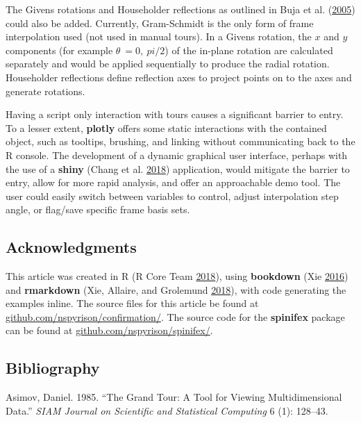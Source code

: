 The Givens rotations and Householder reflections as outlined in Buja et
al. (\protect\hyperlink{ref-buja_computational_2005}{2005}) could also
be added. Currently, Gram-Schmidt is the only form of frame
interpolation used (not used in manual tours). In a Givens rotation, the
\(x\) and \(y\) components (for example \(\theta~= 0,~pi/2\)) of the
in-plane rotation are calculated separately and would be applied
sequentially to produce the radial rotation. Householder reflections
define reflection axes to project points on to the axes and generate
rotations.

Having a script only interaction with tours causes a significant barrier
to entry. To a lesser extent, \textbf{plotly} offers some static
interactions with the contained object, such as tooltips, brushing, and
linking without communicating back to the R console. The development of
a dynamic graphical user interface, perhaps with the use of a
\textbf{shiny} (Chang et al.
\protect\hyperlink{ref-chang_shiny:_2018}{2018}) application, would
mitigate the barrier to entry, allow for more rapid analysis, and offer
an approachable demo tool. The user could easily switch between
variables to control, adjust interpolation step angle, or flag/save
specific frame basis sets.

\hypertarget{acknowledgments}{%
\subsection{Acknowledgments}\label{acknowledgments}}

This article was created in R (R Core Team
\protect\hyperlink{ref-r_core_team_r:_2018}{2018}), using
\textbf{bookdown} (Xie \protect\hyperlink{ref-xie_bookdown:_2016}{2016})
and \textbf{rmarkdown} (Xie, Allaire, and Grolemund
\protect\hyperlink{ref-xie_r_2018}{2018}), with code generating the
examples inline. The source files for this article be found at
\href{https://github.com/nspyrison/confirmation/}{github.com/nspyrison/confirmation/}.
The source code for the \textbf{spinifex} package can be found at
\href{https://github.com/nspyrison/spinifex/}{github.com/nspyrison/spinifex/}.

\hypertarget{bibliography}{%
\subsection*{Bibliography}\label{bibliography}}

\hypertarget{refs}{}
\leavevmode\hypertarget{ref-asimov_grand_1985}{}%
Asimov, Daniel. 1985. ``The Grand Tour: A Tool for Viewing
Multidimensional Data.'' \emph{SIAM Journal on Scientific and
Statistical Computing} 6 (1): 128--43.

